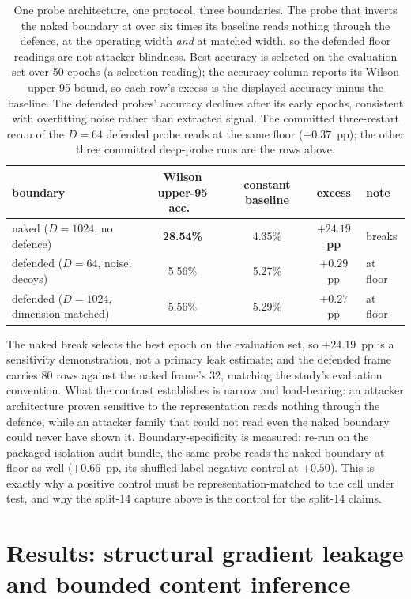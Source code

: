\documentclass[11pt]{article}
\newcommand{\pp}{pp}
\begin{document}
\begin{table}[H]
\centering\small
\begin{tabular}{@{}lcccl@{}}
\toprule
boundary & Wilson upper-95 acc.\ & constant baseline & excess & note \\
\midrule
naked ($D{=}1024$, no defence) & \textbf{28.54\%} & 4.35\% & \textbf{$+24.19$ pp} & breaks \\
defended ($D{=}64$, noise, decoys) & 5.56\% & 5.27\% & $+0.29$ pp & at floor \\
defended ($D{=}1024$, dimension-matched) & 5.56\% & 5.29\% & $+0.27$ pp & at floor \\
\bottomrule
\end{tabular}


\caption{One probe architecture, one protocol, three boundaries. The probe that
inverts the naked boundary at over six times its baseline reads nothing through the
defence, at the operating width \emph{and} at matched width, so the
defended floor readings are not attacker blindness. Best accuracy is selected
on the evaluation set over 50 epochs (a selection reading); the accuracy column
reports its Wilson upper-95 bound, so each row's excess is the displayed accuracy
minus the baseline. The defended probes' accuracy declines after its early epochs,
consistent with overfitting noise rather than extracted signal. The
committed three-restart rerun of the $D{=}64$ defended probe reads at the same
floor ($+0.37$~\pp{}); the other three committed deep-probe runs are the rows
above.}
\label{tab:positive_control}
\end{table}

The naked break selects the best epoch on the evaluation set,
so $+24.19$~\pp{} is a sensitivity demonstration, not a primary leak estimate; and
the defended frame carries 80 rows against the naked frame's 32, matching the
study's evaluation convention. What the contrast establishes is narrow and
load-bearing: an attacker architecture proven sensitive to the representation
reads nothing through the defence, while an attacker family that could not read
even the naked boundary could never have shown it. Boundary-specificity is measured: re-run on the packaged isolation-audit bundle, the same probe reads
the naked boundary at floor as well ($+0.66$~\pp{}, its shuffled-label
negative control at $+0.50$). This is exactly why a
positive control must be representation-matched to the cell under test, and why
the split-14 capture above is the control for the split-14 claims.

\section{Results: structural gradient leakage and bounded content inference}
\label{sec:results}
\end{document}
